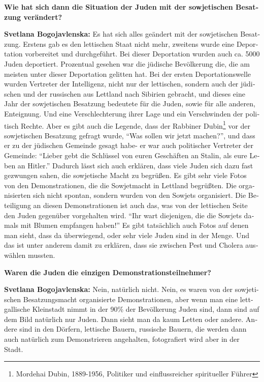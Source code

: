 \begin{otherlanguage}{ngerman}
\textbf{Wie hat sich dann die Situation der Juden mit der sowjetischen Besatzung verändert?}

\textbf{Svetlana Bogojavlenska:} Es hat sich alles geändert mit der sowjetischen Besatzung. Erstens gab es den lettischen Staat nicht mehr, zweitens wurde eine Deportation vorbereitet und durchgeführt. Bei dieser Deportation wurden auch ca. 5000 Juden deportiert. Prozentual gesehen war die jüdische Bevölkerung die, die am meisten unter dieser Deportation gelitten hat. Bei der ersten Deportationswelle wurden Vertreter der Intelligenz, nicht nur der lettischen, sondern auch der jüdischen und der russischen aus Lettland nach Sibirien gebracht, und dieses eine Jahr der sowjetischen Besatzung bedeutete für die Juden, sowie für alle anderen, Enteignung. Und eine Verschlechterung ihrer Lage und ein Verschwinden der politisch Rechte. 
Aber es gibt auch die Legende, dass der Rabbiner Dubin\footnote{Mordehai Dubin, 1889-1956, Politiker und einflussreicher spiritueller Führer} vor der sowjetischen Besatzung gefragt wurde, "`Was sollen wir jetzt machen?"', und dass er zu der jüdischen Gemeinde gesagt habe- er war auch politischer Vertreter der Gemeinde: "`Lieber gebt die Schlüssel von euren Geschäften an Stalin, als eure Leben an Hitler."' Dadurch lässt sich auch erklären, dass viele Juden sich dazu fast gezwungen sahen, die sowjetische Macht zu begrüßen. Es gibt sehr viele Fotos von den Demonstrationen, die die Sowjetmacht in Lettland begrüßten. Die organisierten sich nicht spontan, sondern wurden von den Sowjets organisiert. Die Beteiligung an diesen Demonstrationen ist auch das, was von der lettischen Seite den Juden gegenüber vorgehalten wird. "`Ihr wart diejenigen, die die Sowjets damals mit Blumen empfangen haben!"' Es gibt tatsächlich auch Fotos auf denen man sieht, dass da überwiegend, oder sehr viele Juden sind in der Menge. Und das ist unter anderem damit zu erklären, dass sie zwischen Pest und Cholera auswählen mussten. 

\textbf{Waren die Juden die einzigen Demonstrationsteilnehmer?}

\textbf{Svetlana Bogojavlenska:} Nein, natürlich nicht. Nein, es waren von der sowjetischen Besatzungsmacht organisierte Demonstrationen, aber wenn man eine lettgallische Kleinstadt nimmt in der 90\% der Bevölkerung Juden sind, dann sind auf dem Bild natürlich nur Juden. Dann sieht man da kaum Letten oder andere. Andere sind in den Dörfern, lettische Bauern, russische Bauern, die werden dann auch natürlich zum Demonstrieren angehalten, fotografiert wird aber in der Stadt.


\end{otherlanguage}
